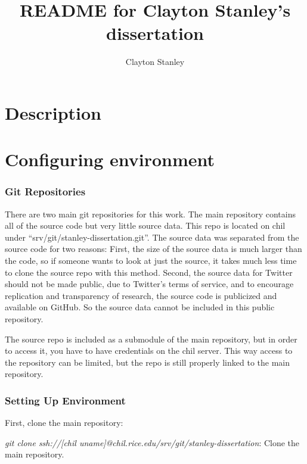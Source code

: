 \documentclass[man,floatsintext,donotrepeattitle]{apa6}
\title{README for Clayton Stanley's dissertation}
\author{Clayton Stanley}
\affiliation{Rice University}
\begin{document}
\maketitle

\section{Description}



\section{Configuring environment}

\subsubsection{Git Repositories}

There are two main git repositories for this work.
The main repository contains all of the source code but very little source data.
This repo is located on chil under ``srv/git/stanley-dissertation.git''.
The source data was separated from the source code for two reasons:
First, the size of the source data is much larger than the code, so if someone wants to look at just the source, it takes much less time to clone the source repo with this method.
Second, the source data for Twitter should not be made public, due to Twitter's terms of service,
and to encourage replication and transparency of research, the source code is publicized and available on GitHub.
So the source data cannot be included in this public repository.

The source repo is included as a submodule of the main repository, but in order to access it, you have to have credentials on the chil server.
This way access to the repository can be limited, but the repo is still properly linked to the main repository.

\subsubsection{Setting Up Environment}

First, clone the main repository:

\begin{singlespace}
\begin{compactitem}
  \item \emph{git clone ssh://[chil uname]@chil.rice.edu/srv/git/stanley-dissertation}:
    Clone the main repository.
\end{compactitem}
\end{singlespace}
\end{document}
